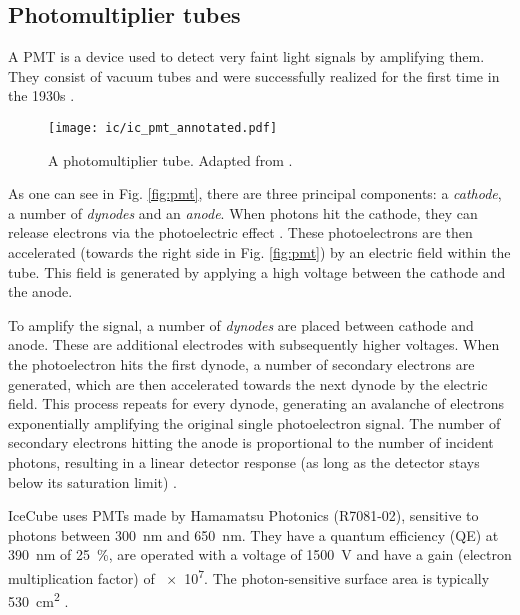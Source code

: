 \subsection{Photomultiplier tubes}
A PMT is a device used to detect very faint light signals by amplifying them. They consist of vacuum tubes and were successfully realized for the first time in the 1930s .

\begin{figure}[h!]
    \texttt{[image: ic/ic\_pmt\_annotated.pdf]}
    \caption[PMT schematic]{A photomultiplier tube. Adapted from \cite{Bednarski2014}.}
\end{figure}

As one can see in Fig. \ref{fig:pmt}, there are three principal components: a \textit{cathode}, a number of \textit{dynodes} and an \textit{anode}. When photons hit the cathode, they can release electrons via the photoelectric effect . These photoelectrons are then accelerated (towards the right side in Fig. \ref{fig:pmt}) by an electric field within the tube. This field is generated by applying a high voltage between the cathode and the anode.

To amplify the signal, a number of \textit{dynodes} are placed between cathode and anode. These are additional electrodes with subsequently higher voltages. When the photoelectron hits the first dynode, a number of secondary electrons are generated, which are then accelerated towards the next dynode by the electric field. This process repeats for every dynode, generating an avalanche of electrons exponentially amplifying the original single photoelectron signal. The number of secondary electrons hitting the anode is proportional to the number of incident photons, resulting in a linear detector response (as long as the detector stays below its saturation limit) .

IceCube uses PMTs made by Hamamatsu Photonics (R7081-02), sensitive to photons between \SI{300}{\nm} and \SI{650}{\nm}. They have a quantum efficiency (QE) at \SI{390}{\nm} of \SI{25}{\percent}, are operated with a voltage of \SI{1500}{\V} and have a gain (electron multiplication factor) of \num{e7}. The photon-sensitive surface area is typically \SI{530}{\cm\squared} .

